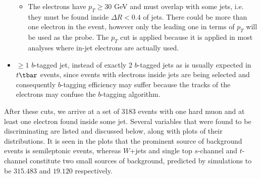 \begin{itemize}[label=]
\begin{itemize}
		      \item The electrons have $p_T \geq 30$ GeV and must overlap with some jets,
		            i.e. they must be found inside $\Delta R < 0.4$ of jets. There could be more
		            than one electron in the event, however only the leading one in terms of $p_T$
		            will be used as the probe. The $p_T$ cut is applied because it is applied in
		            most analyses where in-jet electrons are actually used.

	      \end{itemize}

	\item $\geq 1$ $b$-tagged jet, instead of exactly $2$ $b$-tagged jets as is
	      usually expected in $t\tbar$ events, since events with electrons inside jets
	      are being selected and consequently $b$-tagging efficiency may suffer because
	      the tracks of the electrons may confuse the $b$-tagging algorithm.

\end{itemize}

After these cuts, we arrive at a set of 3183 events with one hard muon and at
least one electron found inside some jet. Several variables that were found to
be discriminating are listed and discussed below, along with plots of their
distributions. It is seen in the plots that the prominent source of background
events is semileptonic events, whereas $W$+jets and single top $s$-channel and
$t$-channel constitute two small sources of background, predicted by
simulations to be $315.483$ and $19.120$ respectively.


